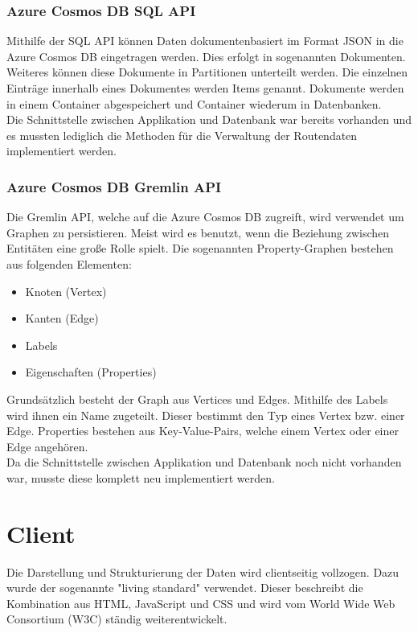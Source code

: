         \subsubsection{Azure Cosmos DB SQL API}
        Mithilfe der SQL API können Daten dokumentenbasiert im Format JSON in die Azure Cosmos DB 
        eingetragen werden. Dies erfolgt in sogenannten Dokumenten. Weiteres können diese Dokumente
        in Partitionen unterteilt werden. Die einzelnen Einträge innerhalb eines Dokumentes werden 
        Items genannt. Dokumente werden in einem Container abgespeichert und Container wiederum in Datenbanken.
        \\
        Die Schnittstelle zwischen Applikation und Datenbank war bereits vorhanden und es mussten lediglich
        die Methoden für die Verwaltung der Routendaten implementiert werden.

        \subsubsection{Azure Cosmos DB Gremlin API}
        Die Gremlin API, welche auf die Azure Cosmos DB zugreift, wird verwendet um Graphen zu persistieren.
        Meist wird es benutzt, wenn die Beziehung zwischen Entitäten eine große Rolle spielt. Die sogenannten
        Property-Graphen bestehen aus folgenden Elementen:
        \begin{itemize}
            \item Knoten (Vertex)
            \item Kanten (Edge)
            \item Labels
            \item Eigenschaften (Properties)
        \end{itemize}
        Grundsätzlich besteht der Graph aus Vertices und Edges. Mithilfe des Labels wird ihnen ein Name zugeteilt.
        Dieser bestimmt den Typ eines Vertex bzw. einer Edge. Properties bestehen aus Key-Value-Pairs, welche
        einem Vertex oder einer Edge angehören. 
        \\
        Da die Schnittstelle zwischen Applikation und Datenbank noch nicht vorhanden war, musste diese
        komplett neu implementiert werden.

\section{Client}
Die Darstellung und Strukturierung der Daten wird clientseitig vollzogen. Dazu wurde der sogenannte 
"living standard" verwendet. Dieser beschreibt die Kombination aus HTML, JavaScript und CSS und wird
vom World Wide Web Consortium (W3C) ständig weiterentwickelt.

